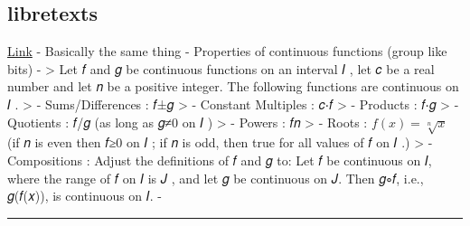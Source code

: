 \documentclass[letterpaper]{article}
\begin{document}
\subsection{libretexts}
\label{sec:org0c45e15}
\href{https://math.libretexts.org/Bookshelves/Calculus/Book\%3A\_Calculus\_(Apex)/01\%3A\_Limits/1.05\%3A\_Continuity}{Link} -
Basically the same thing - Properties of continuous functions (group
like bits) - > Let 𝑓 and 𝑔 be continuous functions on an interval 𝐼 ,
let 𝑐 be a real number and let 𝑛 be a positive integer. The following
functions are continuous on 𝐼 . > - Sums/Differences : 𝑓±𝑔 > - Constant
Multiples : 𝑐⋅𝑓 > - Products : 𝑓⋅𝑔 > - Quotients : 𝑓/𝑔 (as long as 𝑔≠0
on 𝐼 ) > - Powers : 𝑓𝑛 > - Roots : \(f(x) = \sqrt[n]{x}\) (if 𝑛 is even
then 𝑓≥0 on 𝐼 ; if 𝑛 is odd, then true for all values of 𝑓 on 𝐼 .) > -
Compositions : Adjust the definitions of 𝑓 and 𝑔 to: Let 𝑓 be continuous
on 𝐼, where the range of 𝑓 on 𝐼 is 𝐽 , and let 𝑔 be continuous on 𝐽.
Then 𝑔∘𝑓, i.e., 𝑔(𝑓(𝑥)), is continuous on 𝐼. -

\noindent\rule{\textwidth}{0.5pt}
\end{document}
